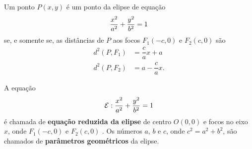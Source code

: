 \documentclass{beamer}
\begin{document}
\begin{frame}
    \begin{proposicao}
        Um ponto $P(x,y)$ é um ponto da elipse de equação
        \[
            \dfrac{x^2}{a^2} + \dfrac{y^2}{b^2} = 1
        \]\pause
        se, e somente se, \pause as distâncias de $P$ aos focos $F_1(-c, 0)$ e $F_2(c, 0)$ são\pause
        \begin{align*}
            d^2(P,F_1) & = \dfrac{c}{a}x + a  \\
            d^2(P,F_2) & = a - \dfrac{c}{a}x.
        \end{align*}
    \end{proposicao}
\end{frame}

\begin{frame}
    \begin{definicao}
        A equação\pause
        \begin{align}\label{equacaoelipse}
            \mathcal{E}: \dfrac{x^2}{a^2} + \dfrac{y^2}{b^2} = 1
        \end{align}\pause
        é chamada de \textbf{equação reduzida da elipse} \pause de centro $O(0,0)$ \pause e focos no eixo $x$, onde $F_1(-c, 0)$ e $F_2(c, 0)$ . \pause Os números $a$, \pause $b$ \pause
        e $c$, \pause onde $c^2 = a^2 + b^2$, \pause são chamados de \textbf{parâmetros geométricos} \pause da elipse.
    \end{definicao}
\end{frame}
\end{document}
